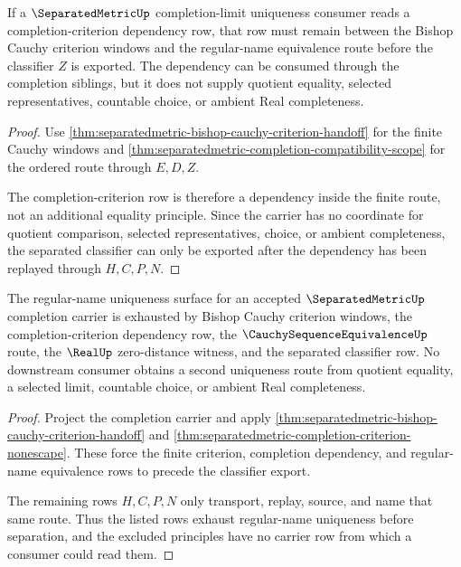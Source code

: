 \begin{theorem}\label{thm:separatedmetric-completion-criterion-nonescape}
If a $\SeparatedMetricUp$ completion-limit uniqueness consumer reads a completion-criterion dependency row, that row must remain between the Bishop Cauchy criterion windows and the regular-name equivalence route before the classifier $Z$ is exported. The dependency can be consumed through the completion siblings, but it does not supply quotient equality, selected representatives, countable choice, or ambient Real completeness.
\end{theorem}
\begin{proof}
Use \autoref{thm:separatedmetric-bishop-cauchy-criterion-handoff} for the finite Cauchy windows and \autoref{thm:separatedmetric-completion-compatibility-scope} for the ordered route through $E,D,Z$.

The completion-criterion row is therefore a dependency inside the finite route, not an additional equality principle. Since the carrier has no coordinate for quotient comparison, selected representatives, choice, or ambient completeness, the separated classifier can only be exported after the dependency has been replayed through $H,C,P,N$.
\end{proof}

\begin{theorem}\label{thm:separatedmetric-regular-name-uniqueness-exhaustion}
The regular-name uniqueness surface for an accepted $\SeparatedMetricUp$ completion carrier is exhausted by Bishop Cauchy criterion windows, the completion-criterion dependency row, the $\CauchySequenceEquivalenceUp$ route, the $\RealUp$ zero-distance witness, and the separated classifier row. No downstream consumer obtains a second uniqueness route from quotient equality, a selected limit, countable choice, or ambient Real completeness.
\end{theorem}
\begin{proof}
Project the completion carrier and apply \autoref{thm:separatedmetric-bishop-cauchy-criterion-handoff} and \autoref{thm:separatedmetric-completion-criterion-nonescape}. These force the finite criterion, completion dependency, and regular-name equivalence rows to precede the classifier export.

The remaining rows $H,C,P,N$ only transport, replay, source, and name that same route. Thus the listed rows exhaust regular-name uniqueness before separation, and the excluded principles have no carrier row from which a consumer could read them.
\end{proof}

